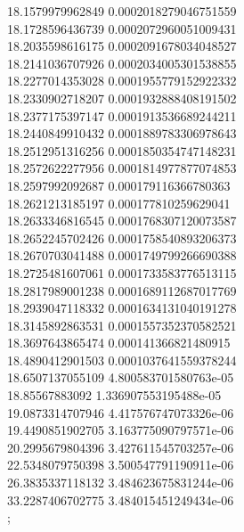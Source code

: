 {18.1579979962849 0.0002018279046751559 \\
18.1728596436739 0.0002072960051009431 \\
18.2035598616175 0.0002091678034048527 \\
18.2141036707926 0.0002034005301538855 \\
18.2277014353028 0.0001955779152922332 \\
18.2330902718207 0.0001932888408191502 \\
18.2377175397147 0.0001913536689244211 \\
18.2440849910432 0.0001889783306978643 \\
18.2512951316256 0.0001850354747148231 \\
18.2572622277956 0.0001814977877074853 \\
18.2597992092687 0.000179116366780363 \\
18.2621213185197 0.000177810259629041 \\
18.2633346816545 0.0001768307120073587 \\
18.2652245702426 0.0001758540893206373 \\
18.2670703041488 0.0001749799266690388 \\
18.2725481607061 0.0001733583776513115 \\
18.2817989001238 0.0001689112687017769 \\
18.2939047118332 0.0001634131040191278 \\
18.3145892863531 0.0001557352370582521 \\
18.3697643865474 0.000141366821480915 \\
18.4890412901503 0.0001037641559378244 \\
18.6507137055109 4.800583701580763e-05 \\
18.85567883092 1.336907553195488e-05 \\
19.0873314707946 4.417576747073326e-06 \\
19.4490851902705 3.163775090797571e-06 \\
20.2995679804396 3.427611545703257e-06 \\
22.5348079750398 3.500547791190911e-06 \\
26.3835337118132 3.484623675831244e-06 \\
33.2287406702775 3.484015451249434e-06 \\
};
